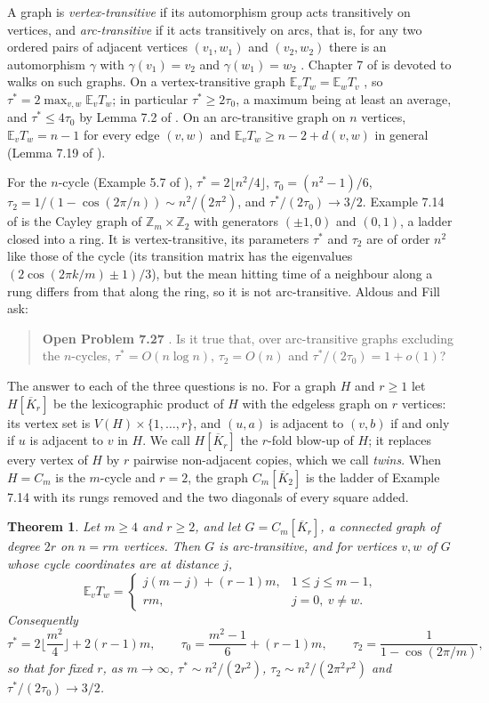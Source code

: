 \documentclass[11pt]{amsart}
\newtheorem{theorem}{Theorem}[section]
\theoremstyle{definition}
\newcommand{\Z}{\mathbb{Z}}
\newcommand{\E}{\mathbb{E}}
\newcommand{\Kbar}{\overline{K}}
\begin{document}
A graph is \emph{vertex-transitive} if its automorphism group acts transitively on vertices, and \emph{arc-transitive} if it acts transitively on arcs, that is, for any two ordered pairs of adjacent vertices $(v_1,w_1)$ and $(v_2,w_2)$ there is an automorphism $\gamma$ with $\gamma(v_1)=v_2$ and $\gamma(w_1)=w_2$ \cite{Biggs,GodsilRoyle}. Chapter 7 of \cite{AF} is devoted to walks on such graphs. On a vertex-transitive graph $\E_vT_w=\E_wT_v$ \cite{Aldous89}, so $\tau^*=2\max_{v,w}\E_vT_w$; in particular $\tau^*\ge2\tau_0$, a maximum being at least an average, and $\tau^*\le4\tau_0$ by Lemma 7.2 of \cite{AF}. On an arc-transitive graph on $n$ vertices, $\E_vT_w=n-1$ for every edge $(v,w)$ and $\E_vT_w\ge n-2+d(v,w)$ in general (Lemma 7.19 of \cite{AF}).

For the $n$-cycle (Example 5.7 of \cite{AF}), $\tau^*=2\lfloor n^2/4\rfloor$, $\tau_0=(n^2-1)/6$, $\tau_2=1/(1-\cos(2\pi/n))\sim n^2/(2\pi^2)$, and $\tau^*/(2\tau_0)\to3/2$. Example 7.14 of \cite{AF} is the Cayley graph of $\Z_m\times\Z_2$ with generators $(\pm1,0)$ and $(0,1)$, a ladder closed into a ring. It is vertex-transitive, its parameters $\tau^*$ and $\tau_2$ are of order $n^2$ like those of the cycle (its transition matrix has the eigenvalues $(2\cos(2\pi k/m)\pm1)/3$), but the mean hitting time of a neighbour along a rung differs from that along the ring, so it is not arc-transitive. Aldous and Fill ask:

\begin{quote}
\textbf{Open Problem 7.27} \cite{AF}. Is it true that, over arc-transitive graphs excluding the $n$-cycles, $\tau^*=O(n\log n)$, $\tau_2=O(n)$ and $\tau^*/(2\tau_0)=1+o(1)$?
\end{quote}

The answer to each of the three questions is no. For a graph $H$ and $r\ge1$ let $H[\Kbar_r]$ be the lexicographic product of $H$ with the edgeless graph on $r$ vertices: its vertex set is $V(H)\times\{1,\dots,r\}$, and $(u,a)$ is adjacent to $(v,b)$ if and only if $u$ is adjacent to $v$ in $H$. We call $H[\Kbar_r]$ the $r$-fold blow-up of $H$; it replaces every vertex of $H$ by $r$ pairwise non-adjacent copies, which we call \emph{twins}. When $H=C_m$ is the $m$-cycle and $r=2$, the graph $C_m[\Kbar_2]$ is the ladder of Example 7.14 with its rungs removed and the two diagonals of every square added.

\begin{theorem}\label{thm:cycle}
Let $m\ge4$ and $r\ge2$, and let $G=C_m[\Kbar_r]$, a connected graph of degree $2r$ on $n=rm$ vertices. Then $G$ is arc-transitive, and for vertices $v,w$ of $G$ whose cycle coordinates are at distance $j$,
\[
\E_vT_w=\begin{cases} j(m-j)+(r-1)m, & 1\le j\le m-1,\\ rm, & j=0,\ v\ne w.\end{cases}
\]
Consequently
\[
\tau^*=2\Big\lfloor\frac{m^2}{4}\Big\rfloor+2(r-1)m,\qquad
\tau_0=\frac{m^2-1}{6}+(r-1)m,\qquad
\tau_2=\frac1{1-\cos(2\pi/m)},
\]
so that for fixed $r$, as $m\to\infty$, $\tau^*\sim n^2/(2r^2)$, $\tau_2\sim n^2/(2\pi^2r^2)$ and $\tau^*/(2\tau_0)\to3/2$.
\end{theorem}
\end{document}
